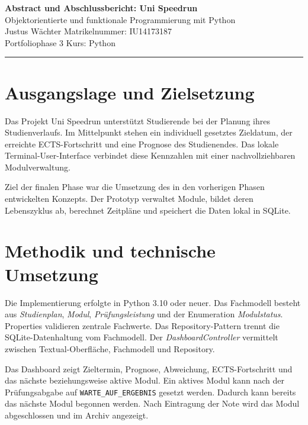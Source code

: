 \documentclass[11pt,a4paper]{article}
\newcommand{\projektname}{Uni Speedrun}
\newcommand{\matrikelnummer}{IU14173187}
\newcommand{\kurs}{Python}
\begin{document}
\begin{center}
    {\Large\textbf{Abstract und Abschlussbericht: \projektname}}\\[3pt]
    {\large Objektorientierte und funktionale Programmierung mit Python}\\[6pt]

    Justus Wächter \hfill Matrikelnummer: \matrikelnummer\\
    Portfoliophase 3 \hfill Kurs: \kurs
\end{center}

\hrule
\vspace{0.4cm}

\section{Ausgangslage und Zielsetzung}
Das Projekt Uni Speedrun unterstützt Studierende bei der Planung ihres Studienverlaufs. Im Mittelpunkt stehen ein individuell gesetztes Zieldatum, der erreichte ECTS-Fortschritt und eine Prognose des Studienendes. Das lokale Terminal-User-Interface verbindet diese Kennzahlen mit einer nachvollziehbaren Modulverwaltung.

Ziel der finalen Phase war die Umsetzung des in den vorherigen Phasen entwickelten Konzepts. Der Prototyp verwaltet Module, bildet deren Lebenszyklus ab, berechnet Zeitpläne und speichert die Daten lokal in SQLite.

\section{Methodik und technische Umsetzung}
Die Implementierung erfolgte in Python 3.10 oder neuer. Das Fachmodell besteht aus \textit{Studienplan}, \textit{Modul}, \textit{Prüfungsleistung} und der Enumeration \textit{Modulstatus}. Properties validieren zentrale Fachwerte. Das Repository-Pattern trennt die SQLite-Datenhaltung vom Fachmodell. Der \textit{DashboardController} vermittelt zwischen Textual-Oberfläche, Fachmodell und Repository.

Das Dashboard zeigt Zieltermin, Prognose, Abweichung, ECTS-Fortschritt und das nächste beziehungsweise aktive Modul. Ein aktives Modul kann nach der Prüfungsabgabe auf \texttt{WARTE\_\allowbreak AUF\_\allowbreak ERGEBNIS} gesetzt werden. Dadurch kann bereits das nächste Modul begonnen werden. Nach Eintragung der Note wird das Modul abgeschlossen und im Archiv angezeigt.
\end{document}
